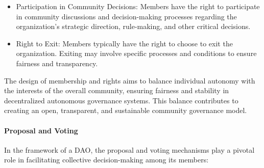 \documentclass[lettersize,journal]{IEEEtran}
\begin{document}
\begin{itemize}
\begin{itemize}
    \item Participation in Community Decisions: Members have the right to participate in community discussions and decision-making processes regarding the organization's strategic direction, rule-making, and other critical decisions.
    \item Right to Exit: Members typically have the right to choose to exit the organization. Exiting may involve specific processes and conditions to ensure fairness and transparency.
  \end{itemize}
\end{itemize}

The design of membership and rights aims to balance individual autonomy with the interests of the overall community, ensuring fairness and stability in decentralized autonomous governance systems. This balance contributes to creating an open, transparent, and sustainable community governance model.

\paragraph{Proposal and Voting}
In the framework of a DAO, the proposal and voting mechanisms play a pivotal role in facilitating collective decision-making among its members:
\end{document}
